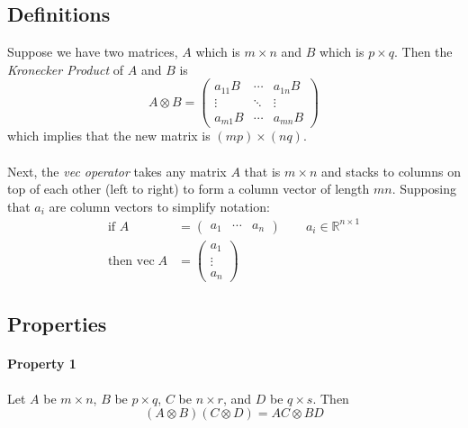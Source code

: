 \documentclass[a4paper,12pt]{scrartcl}
\begin{document}
\subsection{Definitions}
Suppose we have two matrices, $A$ which is $m \times n$ and $B$
which is $p\times q$. Then the {\sl Kronecker Product} of $A$ and $B$ is 
    \[ A \otimes B = \begin{pmatrix} a_{11} B & \cdots & a_{1n} B \\
			    \vdots & \ddots & \vdots \\
			    a_{m1} B & \cdots & a_{mn}B \end{pmatrix}
    \]
which implies that the new matrix is $(mp) \times (nq)$. 
\\
\\
Next, the {\sl vec operator} takes any matrix $A$ that is $m \times n$
and stacks to columns on top of each other (left to right) to 
form a column vector of length $mn$.  Supposing that $a_i$ are column
vectors to simplify notation:
\begin{align*}
    \text{if } A &= \begin{pmatrix} a_1 & \cdots & a_n \end{pmatrix}
	\qquad a_i \in \mathbb{R}^{n\times 1} \\
    \text{then } \text{vec}\; A &= 
	\begin{pmatrix} a_1 \\ \vdots \\ a_n \end{pmatrix}
\end{align*}


\subsection{Properties}

\paragraph{Property 1} Let $A$ be $m\times n$, $B$ be $p \times q$,
$C$ be $n\times r$, and $D$ be $q \times s$. Then
\begin{equation}
    (A \otimes B)(C \otimes D) = AC \otimes BD
\end{equation}

%
%
\end{document}

